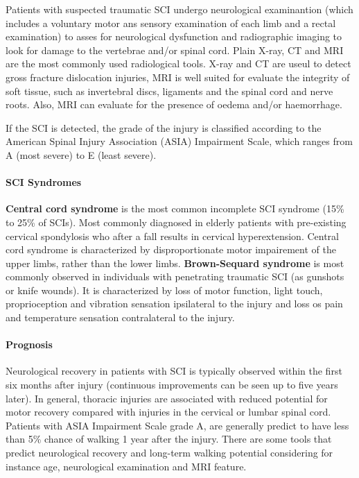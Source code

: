 \documentclass[12pt,article,oneside,a4paper]{memoir}
\begin{document}
Patients with suspected traumatic SCI undergo neurological examinantion (which
includes a voluntary motor ans sensory examination of each limb and a rectal
examination) to asses for neurological dysfunction and radiographic imaging to
look for damage to the vertebrae and/or spinal cord.
Plain X-ray, CT and MRI are the most commonly used radiological tools. X-ray and CT are useul to detect gross fracture dislocation injuries, MRI is well suited for evaluate the integrity of soft tissue, such as invertebral discs, ligaments and the spinal cord and nerve roots. Also, MRI can evaluate for the presence of oedema and/or haemorrhage.

If the SCI is detected, the grade of the injury is classified according to the
American Spinal Injury Association (ASIA) Impairment Scale, which ranges from A
(most severe) to E (least severe).

\paragraph{SCI Syndromes}
\textbf{Central cord syndrome} is the most common incomplete SCI syndrome (15\%
to 25\% of SCIs). Most commonly diagnosed in elderly patients with pre-existing
cervical spondylosis who after a fall results in cervical hyperextension.
Central cord syndrome is characterized by disproportionate motor impairement of
the upper limbs, rather than the lower limbs. \textbf{Brown-Sequard syndrome}
is most commonly observed in individuals with penetrating traumatic SCI (as
gunshots or knife wounds). It is characterized by loss of motor function, light
touch, proprioception and vibration sensation ipsilateral to the injury and loss
os pain and temperature sensation contralateral to the injury.

\paragraph{Prognosis}
Neurological recovery in patients with SCI is typically observed within the
first six months after injury (continuous improvements can be seen up to five
years later). In general, thoracic injuries are associated with reduced
potential for motor recovery compared with injuries in the cervical or lumbar
spinal cord.
Patients with ASIA Impairment Scale grade A, are generally predict to have less
than 5\% chance of walking 1 year after the injury. There are some tools that
predict neurological recovery and long-term walking potential considering for
instance age, neurological examination and MRI feature.
\end{document}
